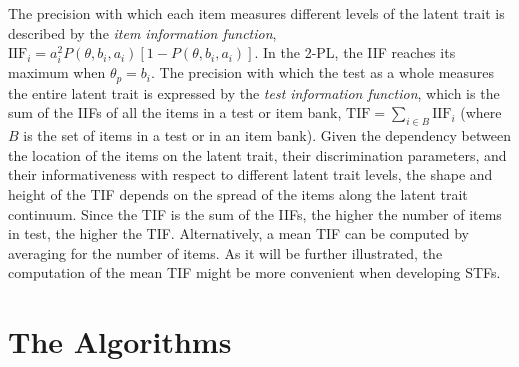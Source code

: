 \documentclass[12pt, a4paper, titilepage]{article}
\begin{document}
The precision with which each item measures different levels of the latent trait is described by the \emph{item information function}, $\text{IIF}_i = a_i^2P(\theta, b_i, a_i)[1- P(\theta, b_i, a_i)]$. In the 2-PL, the IIF reaches its maximum when $\theta_p = b_i$. The precision with which the test as a whole measures the entire latent trait is expressed by the \emph{test information function}, which is the sum of the IIFs of all the items in a test or item bank, $\text{TIF} = \sum_{i \in B} \text{IIF}_i$ (where $B$ is the set of items in a test or in an item bank). 
Given the dependency between the location of the items on the latent trait, their discrimination parameters, and their informativeness with respect to different latent trait levels,  the shape and height of the TIF depends on the spread of the items along the latent trait continuum.
 Since the TIF is the sum of the IIFs, the higher the number of items in  test, the higher the TIF. Alternatively, a mean TIF can be computed by averaging for the number of items. As it will be further illustrated, the computation of the mean TIF might be more convenient when developing STFs.


\normalcolor

\section*{The Algorithms}
\end{document}
